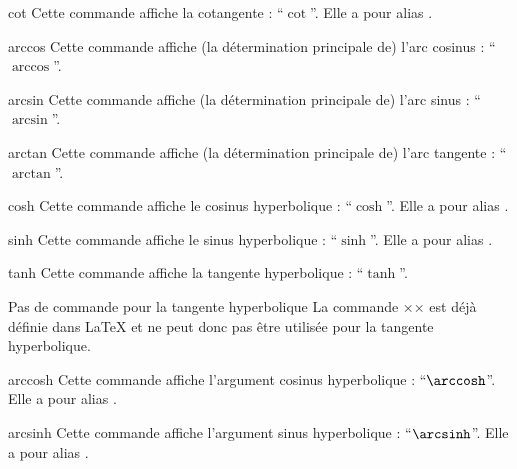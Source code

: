 \documentclass[french,nolocaltoc]{nwejmart}
\newtheorem[style=definition]{fait}
\newtheorem[title=contraventionnalisation]{ctrv}
\newtheorem[title-plural=anneaux]{anneau}
\newtheorem[title-plural=idéaux]{idéal}
\begin{document}
\begin{docCommand}{cot}{}
  Cette commande affiche la cotangente : \enquote{$\cot$}. Elle a pour alias
  .
\end{docCommand}

\begin{docCommand}{arccos}{}
  Cette commande affiche (la détermination principale de) l'arc cosinus :
  \enquote{$\arccos$}.
\end{docCommand}

\begin{docCommand}{arcsin}{}
  Cette commande affiche (la détermination principale de) l'arc sinus :
  \enquote{$\arcsin$}.
\end{docCommand}

\begin{docCommand}{arctan}{}
  Cette commande affiche (la détermination principale de) l'arc tangente :
  \enquote{$\arctan$}.
\end{docCommand}

\begin{docCommand}{cosh}{}
  Cette commande affiche le cosinus hyperbolique : \enquote{$\cosh$}. Elle a pour
  alias .
\end{docCommand}

\begin{docCommand}{sinh}{}
  Cette commande affiche le sinus hyperbolique : \enquote{$\sinh$}. Elle a pour
  alias .
\end{docCommand}

\begin{docCommand}{tanh}{}
  Cette commande affiche la tangente hyperbolique : \enquote{$\tanh$}.
  \begin{dbremark}{Pas de commande \protect{} pour la tangente hyperbolique}{}
    La commande ×\th× est déjà définie dans \LaTeX{} et ne peut donc pas être
    utilisée pour la tangente hyperbolique.
  \end{dbremark}
\end{docCommand}

\begin{docCommand}{arccosh}{}
  Cette commande affiche l'argument cosinus hyperbolique :
  \enquote{$\arccosh$}. Elle a pour alias .
\end{docCommand}

\begin{docCommand}{arcsinh}{}
  Cette commande affiche l'argument sinus hyperbolique :
  \enquote{$\arcsinh$}. Elle a pour alias .
\end{docCommand}
\end{document}
